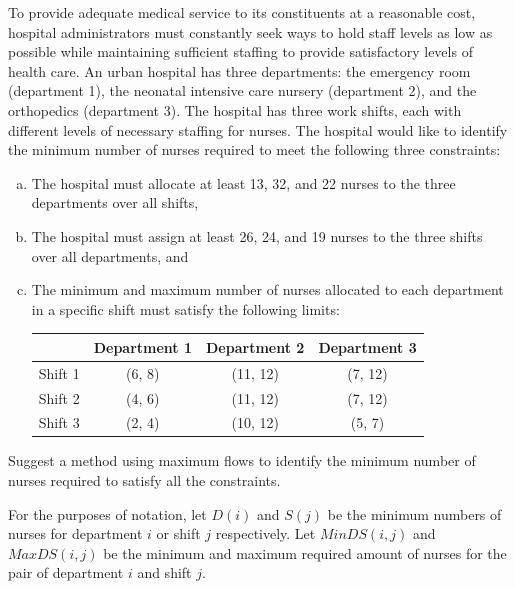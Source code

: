 \documentclass[fleqn]{homework}
\begin{document}
  \maketitle

  \begin{problem}{1}
    \begin{question}
      To provide adequate medical service to its constituents at a reasonable
      cost, hospital administrators must constantly seek ways to hold staff
      levels as low as possible while maintaining sufficient staffing to provide
      satisfactory levels of health care.  An urban hospital has three
      departments: the emergency room (department 1), the neonatal intensive
      care nursery (department 2), and the orthopedics (department 3). The
      hospital has three work shifts, each with different levels of necessary
      staffing for nurses. The hospital would like to identify the minimum
      number of nurses required to meet the following three constraints:

      \begin{enumerate}[a.]
      \item The hospital must allocate at least 13, 32, and 22 nurses to the
        three departments over all shifts,
      \item The hospital must assign at least 26, 24, and 19 nurses to the three
        shifts over all departments, and
      \item The minimum and maximum number of nurses allocated to each
        department in a specific shift must satisfy the following limits:

        \begin{tabular}{|l|ccc|}
          \hline
          & Department 1 & Department 2 & Department 3 \\
          \hline
          Shift 1 & (6, 8) & (11, 12) & (7, 12) \\
          Shift 2 & (4, 6) & (11, 12) & (7, 12) \\
          Shift 3 & (2, 4) & (10, 12) & (5, 7) \\
          \hline
        \end{tabular}
      \end{enumerate}

      Suggest a method using maximum flows to identify the minimum number of
      nurses required to satisfy all the constraints.
    \end{question}

    For the purposes of notation, let $D(i)$ and $S(j)$ be the minimum numbers
    of nurses for department $i$ or shift $j$ respectively.  Let $MinDS(i,j)$
    and $MaxDS(i,j)$ be the minimum and maximum required amount of nurses for
    the pair of department $i$ and shift $j$.


\end{problem}
\end{document}
